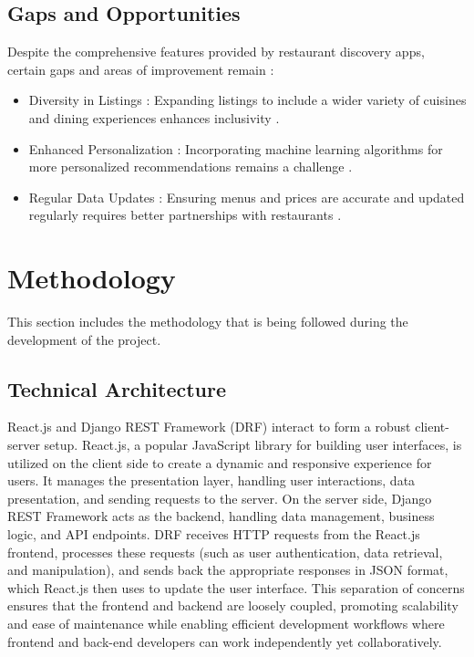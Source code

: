 \documentclass[12pt, a4paper, oneside]{article}
\begin{document}
\subsection{Gaps and Opportunities}
Despite the comprehensive features provided by restaurant discovery apps, certain gaps and areas of improvement remain :

\begin{itemize}
        \item Diversity in Listings : Expanding listings to include a wider variety of cuisines and dining experiences enhances inclusivity \cite{tanta2021inclusivity}.
	\item Enhanced Personalization : Incorporating machine learning algorithms for more personalized recommendations remains a challenge \cite{singh2020restaurant}.
 	\item Regular Data Updates : Ensuring menus and prices are accurate and updated regularly requires better partnerships with restaurants \cite{serrano2020food}.
\end{itemize}

\pagebreak








\section{Methodology}
This section includes the methodology that is being followed during the development of the project.


\subsection{Technical Architecture}
React.js and Django REST Framework (DRF) interact to form a robust client-server setup. React.js, a popular JavaScript library for building user interfaces, is utilized on the client side to create a dynamic and responsive experience for users. It manages the presentation layer, handling user interactions, data presentation, and sending requests to the server. On the server side, Django REST Framework acts as the backend, handling data management, business logic, and API endpoints. DRF receives HTTP requests from the React.js frontend, processes these requests (such as user authentication, data retrieval, and manipulation), and sends back the appropriate responses in JSON format, which React.js then uses to update the user interface. This separation of concerns ensures that the frontend and backend are loosely coupled, promoting scalability and ease of maintenance while enabling efficient development workflows where frontend and back-end developers can work independently yet collaboratively.
\end{document}
